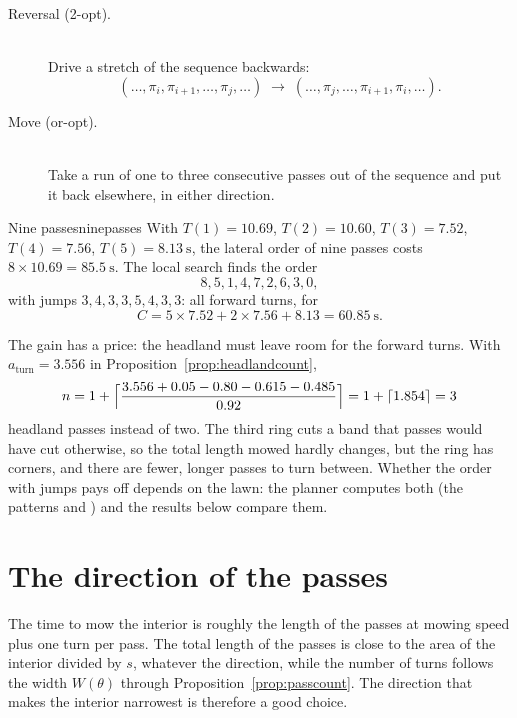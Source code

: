\begin{description}
  \item[Reversal (2-opt).]
    \leavevmode\\
    Drive a stretch of the sequence backwards:
    \[
      (\dots, \pi_i, \pi_{i+1}, \dots, \pi_j, \dots) \;\to\;
      (\dots, \pi_j, \dots, \pi_{i+1}, \pi_i, \dots).
    \]
  \item[Move (or-opt).]
    \leavevmode\\
    Take a run of one to three consecutive passes out of the sequence and
    put it back elsewhere, in either direction.
\end{description}

\begin{example}{Nine passes}{ninepasses}
  With $T(1) = 10.69$, $T(2) = 10.60$, $T(3) = 7.52$, $T(4) = 7.56$, $T(5)
  = \SI{8.13}{\second}$, the lateral order of nine passes costs $8 \times
  10.69 = \SI{85.5}{\second}$. The local search finds the order
  \[
    8, 5, 1, 4, 7, 2, 6, 3, 0,
  \]
  with jumps $3, 4, 3, 3, 5, 4, 3, 3$: all forward turns, for
  \[
    C = 5 \times 7.52 + 2 \times 7.56 + 8.13 = \SI{60.85}{\second}.
  \]
\end{example}

The gain has a price: the headland must leave room for the forward turns.
With $a_{\mathrm{turn}} = 3.556$ in Proposition~\ref{prop:headlandcount},
\[
  n = 1 + \Bigl\lceil \frac{3.556 + 0.05 - 0.80 - 0.615 - 0.485}{0.92}
    \Bigr\rceil = 1 + \lceil 1.854 \rceil = 3
\]
headland passes instead of two. The third ring cuts a band that passes
would have cut otherwise, so the total length mowed hardly changes, but the
ring has corners, and there are fewer, longer passes to turn between.
Whether the order with jumps pays off depends on the lawn: the planner
computes both (the patterns  and ) and the
results below compare them.

\section{The direction of the passes}

The time to mow the interior is roughly the length of the passes at mowing
speed plus one turn per pass. The total length of the passes is close to
the area of the interior divided by $s$, whatever the direction, while the
number of turns follows the width $W(\theta)$ through
Proposition~\ref{prop:passcount}. The direction that makes the interior
narrowest is therefore a good choice.

